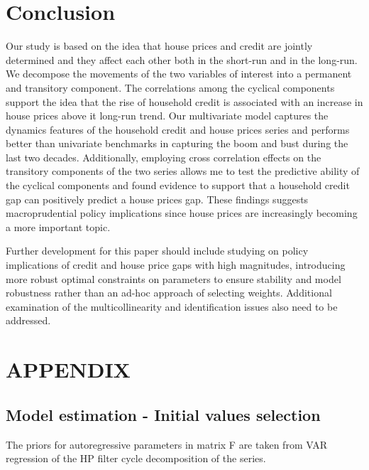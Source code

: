 \documentclass[
  12pt,
]{article}
\begin{document}
\hypertarget{conclusion}{%
\section{Conclusion}\label{conclusion}}

Our study is based on the idea that house prices and credit are jointly determined and they affect each other both in the short-run and in the long-run. We decompose the movements of the two variables of interest into a permanent and transitory component. The correlations among the cyclical components support the idea that the rise of household credit is associated with an increase in house prices above it long-run trend. Our multivariate model captures the dynamics features of the household credit and house prices series and performs better than univariate benchmarks in capturing the boom and bust during the last two decades. Additionally, employing cross correlation effects on the transitory components of the two series allows me to test the predictive ability of the cyclical components and found evidence to support that a household credit gap can positively predict a house prices gap. These findings suggests macroprudential policy implications since house prices are increasingly becoming a more important topic.

Further development for this paper should include studying on policy implications of credit and house price gaps with high magnitudes, introducing more robust optimal constraints on parameters to ensure stability and model robustness rather than an ad-hoc approach of selecting weights. Additional examination of the multicollinearity and identification issues also need to be addressed.

\hypertarget{appendix}{%
\section*{APPENDIX}\label{appendix}}

\hypertarget{model-estimation---initial-values-selection}{%
\subsection*{Model estimation - Initial values selection}\label{model-estimation---initial-values-selection}}

The priors for autoregressive parameters in matrix F are taken from VAR regression of the HP filter cycle decomposition of the series.
\end{document}
